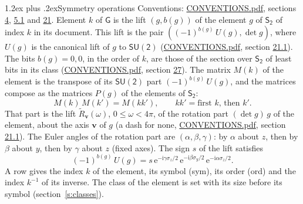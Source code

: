 \documentclass[10pt,a4paper]{article}
\makeatletter
\renewcommand\section{\@startsection{section}{1}{\z@}{-3ex plus -1ex minus -.2ex}%
  {1.2ex plus .2ex}{\normalfont\large\sffamily\bfseries\color{parttitle}}}
\numberwithin{equation}{section}
\newcommand{\grp}[1]{\mathsf{#1}}
\newcommand{\vv}{\mathbf{v}}
\newcommand{\iunit}{\mathrm{i}}
\newcommand{\expe}{\mathrm{e}}
\newcommand{\lift}[1]{\tilde{#1}}
\newcommand{\pauli}[1]{\sigma_{#1}}
\makeatother
\begin{document}
\section{Symmetry operations}\label{s:elements}
Conventions: \href{../../CONVENTIONS.pdf}{CONVENTIONS.pdf}, sections \href{../../../rotation/CONVENTIONS.pdf\#conv.4}{4}, \href{../../../rotation/CONVENTIONS.pdf\#conv.5.1}{5.1} and \href{../../CONVENTIONS.pdf\#conv.21}{21}.
\leavevmode\label{n:index.element}\label{n:element.g}\label{n:function.section}Element $k$ of $\grp{G}$ is the lift $(g, b(g))$ of the element $g$ of \href{../../../rotation/data/pdf/S2.pdf}{$\grp{S_{2}}$} of index $k$ in its document. This lift is the pair $((-1)^{b(g)}\,U(g), \det g)$, where $U(g)$ is the canonical lift of $g$ to $\grp{SU(2)}$ (\href{../../CONVENTIONS.pdf}{CONVENTIONS.pdf}, section \href{../../CONVENTIONS.pdf\#conv.21.1}{21.1}). The bits $b(g) = 0, 0$, in the order of $k$, are those of the section over $\grp{S_{2}}$ of least bits in its class (\href{../../CONVENTIONS.pdf}{CONVENTIONS.pdf}, section \href{../../CONVENTIONS.pdf\#conv.27}{27}). \label{n:matrix.element.pin}\label{n:matrix.element}The matrix $M(k)$ of the element is the transpose of its $\grp{SU(2)}$ part $(-1)^{b(g)}\,U(g)$, and the matrices compose as the matrices $P(g)$ of the elements of $\grp{S_{2}}$:
\begin{equation}\label{e:mprod}M(k)\,M(k') = M(kk'),\qquad kk' = \text{first } k\text{, then } k'.\end{equation}
\leavevmode\label{n:angle.omega}\label{n:vector.axis}That part is the lift $\lift{R}_{\vv}(\omega)$, $0 \le \omega < 4\pi$, of the rotation part $(\det g)\,g$ of the element, about the axis $\vv$ of $g$ (a dash for none, \href{../../CONVENTIONS.pdf}{CONVENTIONS.pdf}, section \href{../../CONVENTIONS.pdf\#conv.21.1}{21.1}). \label{n:angle.euler.alpha}\label{n:angle.euler.beta}\label{n:angle.euler.gamma}\label{n:vector.coordinates}The Euler angles of the rotation part are $(\alpha,\beta,\gamma)$: by $\alpha$ about $z$, then by $\beta$ about $y$, then by $\gamma$ about $z$ (fixed axes). \label{n:local.euler.sign}The sign $s$ of the lift satisfies
\begin{equation}\label{e:euler}(-1)^{b(g)}\,U(g) = s\,\expe^{-\iunit\gamma\pauli{z}/2}\,\expe^{-\iunit\beta\pauli{y}/2}\,\expe^{-\iunit\alpha\pauli{z}/2}.\end{equation}
\leavevmode\label{n:index.element.inverse}\label{n:head.sym}\label{n:head.ord}A row gives the index $k$ of the element, its symbol (sym), its order (ord) and the index $k^{-1}$ of its inverse. \label{n:head.class}The class of the element is set with its size before its symbol (section~\ref{s:classes}).
\end{document}
